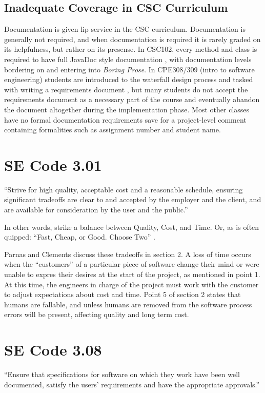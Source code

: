 \documentclass[11pt]{article}
\begin{document}
\subsection{Inadequate Coverage in CSC Curriculum}
Documentation is given lip service in the CSC curriculum.  Documentation is generally not required, and when documentation is required it is rarely graded on its helpfulness, but rather on its presense.  In CSC102, every method and class is required to have full JavaDoc style documentation \cite{mammenjavadoc}, with documentation levels bordering on and entering into \emph{Boring Prose}.  In CPE308/309 (intro to software engineering) students are introduced to the waterfall design process and tasked with writing a requirements document \cite{fisherrequirementsdoc}, but many students do not accept the requirements document as a necessary part of the course and eventually abandon the document altogether during the implementation phase.  Most other classes have no formal documentation requirements save for a project-level comment containing formalities such as assignment number and student name.  

\section{SE Code 3.01}
``Strive for high quality, acceptable cost and a reasonable schedule, ensuring significant tradeoffs are clear to and accepted by the employer and the client, and are available for consideration by the user and the public.'' \cite{secode}

In other words, strike a balance between Quality, Cost, and Time.  Or, as is often quipped: ``Fast, Cheap, or Good.  Choose Two'' \cite{ProjectTriangle}.

Parnas and Clements discuss these tradeoffs in section 2. A loss of time occurs when the ``customers'' of a particular piece of software change their mind or were unable to expres their desires at the start of the project, as mentioned in point 1.  At this time, the engineers in charge of the project must work with the customer to adjust expectations about cost and time.  Point 5 of section 2 states that humans are fallable, and unless humans are removed from the software process errors will be present, affecting quality and long term cost. 

\section{SE Code 3.08}
``Ensure that specifications for software on which they work have been well documented, satisfy the users’ requirements and have the appropriate approvals.'' \cite{secode}
\end{document}
